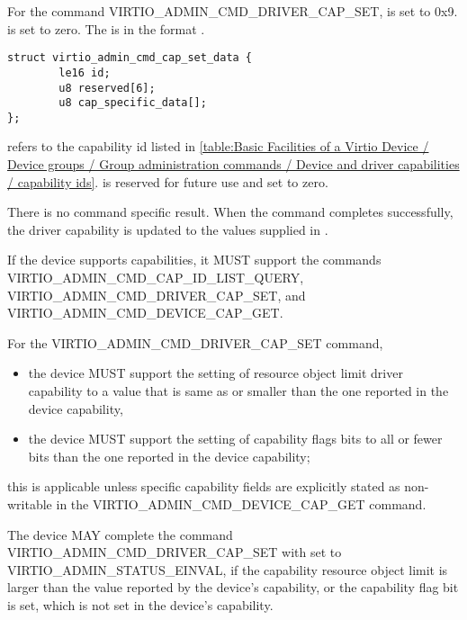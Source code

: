 For the command VIRTIO_ADMIN_CMD_DRIVER_CAP_SET,  is set to 0x9.
 is set to zero.
The  is in the format
.

\begin{lstlisting}
struct virtio_admin_cmd_cap_set_data {
        le16 id;
        u8 reserved[6];
        u8 cap_specific_data[];
};
\end{lstlisting}

 refers to the capability id listed in \ref{table:Basic Facilities of a Virtio Device / Device groups / Group administration commands / Device and driver capabilities / capability ids}.
 is reserved for future use and set to zero.

There is no command specific result.
When the command completes successfully, the driver capability is updated to
the values supplied in .


If the device supports capabilities, it MUST support the commands
VIRTIO_ADMIN_CMD_CAP_ID_LIST_QUERY,
VIRTIO_ADMIN_CMD_DRIVER_CAP_SET, and
VIRTIO_ADMIN_CMD_DEVICE_CAP_GET.

For the VIRTIO_ADMIN_CMD_DRIVER_CAP_SET command,
\begin{itemize}
\item the device MUST support the setting of resource object limit driver capability to a
value that is same as or smaller than the one reported in the device
capability,
\item the device MUST support the setting of capability flags bits to
all or fewer bits than the one reported in the device capability;
\end{itemize}
this is applicable unless specific capability fields are explicitly
stated as non-writable in the VIRTIO_ADMIN_CMD_DEVICE_CAP_GET command.

The device MAY complete the command VIRTIO_ADMIN_CMD_DRIVER_CAP_SET with
 set to VIRTIO_ADMIN_STATUS_EINVAL,
if the capability resource object limit is larger than the value reported by the
device's capability, or the capability flag bit is set, which is not set in
the device's capability.

